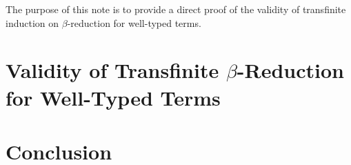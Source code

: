 \documentclass[11pt,twoside]{article}
\begin{document}
The purpose of this note is to provide a direct proof of the validity of transfinite
induction on $\beta$-reduction for well-typed terms.

\section{Validity of Transfinite $\beta$-Reduction for Well-Typed Terms}




\section{Conclusion}



\end{document}
